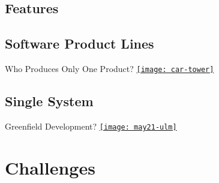 \subsection{Features}

\subsection{Software Product Lines}
\begin{frame}{Who Produces Only One Product?}
	\href{https://pxhere.com/en/photo/920906}{\texttt{[image: car-tower]}}
\end{frame}

\subsection{Single System}

\begin{frame}{Greenfield Development? }
	\href{https://github.com/SoftVarE-Group/SlideTemplate/blob/main/pics/nature/may21-ulm.jpg}{\texttt{[image: may21-ulm]}}
\end{frame}




%

\lessonslearned{
	\item \ldots
}{
	\item \ldots
}{
	\ldots
}

\sectionend

\section{Challenges}


